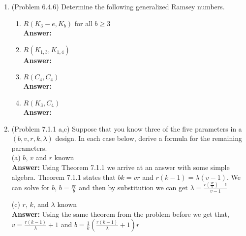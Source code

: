 \documentclass{amsart}
\begin{document}
\thispagestyle{fancy}
 
\begin{enumerate}
\item (Problem 6.4.6) Determine the following generalized Ramsey numbers.\\
	\begin{enumerate}
	\item $R(K_3-e,K_b)$ for all $b \geq 3$\\
	
	\textbf{Answer:} 	
	\vspace{1in}
	
	\item $R(K_{1,3},K_{1,4})$\\
	
	\textbf{Answer:} 
	
	\vspace{1in}
	
	\item $R(C_4,C_4)$\\
	
	\textbf{Answer:} 
	
	\vspace{1in}
	
	\item $R(K_3,C_4)$\\
	
	\textbf{Answer:} 
	
	\vspace{1in}
	\end{enumerate}
	
\item (Problem 7.1.1 a,c) Suppose that you know three of the five parameters in a $(b,v,r,k, \lambda)$ design. In each case below, derive a formula for the remaining parameters.\\
	
	(a)  $b$, $v$ and $r$ known\\
	
	\textbf{Answer:} Using Theorem 7.1.1 we arrive at an answer with some simple algebra. Theorem 7.1.1 states that $bk = vr$ and $r(k - 1) = \lambda(v - 1)$. We can solve for $b$, $b = \frac{vr}{b}$ and then by substitution we can get $\lambda = \frac{r(\frac{vr}{b}) - 1}{v-1}$
	
	\vspace{1in}
	
	(c)  $r$, $k$, and $\lambda$ known\\
	
	\textbf{Answer:} Using the same theorem from the problem before we get that, $v = \frac{r(k - 1)}{\lambda}+1$ and $b = \frac{1}{k}(\frac{r(k - 1)}{\lambda}+1)r$
	

\end{enumerate}
\end{document}
